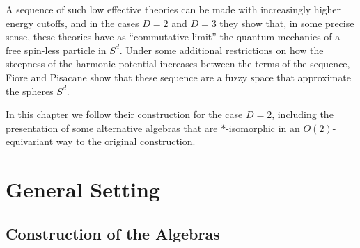 A sequence of such low effective theories can be made with increasingly higher energy cutoffs, and in the cases $D = 2$ and $D = 3$ they show that, in some precise sense, these theories have as ``commutative limit'' the quantum mechanics of a free spin-less particle in $S^d$. Under some additional restrictions on how the steepness of the harmonic potential increases between the terms of the sequence, Fiore and Pisacane show that these sequence are a fuzzy space that approximate the spheres $S^d$.

In this chapter we follow their construction for the case $D = 2$, including the presentation of some alternative algebras that are $*$-isomorphic in an $O(2)$-equivariant way to the original construction.

\section{General Setting}

    
    
    

\subsection{Construction of the Algebras}

